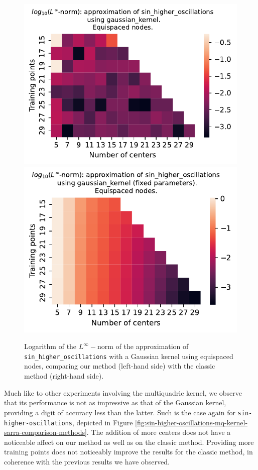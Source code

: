 \documentclass[12pt]{report} %
\begin{document}
\begin{figure}[ht]
    \centering
    \includegraphics[width=.49\textwidth]{imagenes/experiments/1d/variational/sin_higher_oscillations-Kgaussian_kernel-Equi.pdf}
    \includegraphics[width=.49\textwidth]{imagenes/experiments/1d/least_squares/opt-sin_higher_oscillations-Kgaussian_kernel-Equi.pdf}
    \caption{Logarithm of the $L^\infty-$norm of the approximation of \texttt{sin\_higher\_oscillations} with a Gaussian kernel using equispaced nodes, comparing our method (left-hand side) with the classic method (right-hand side).}
    \label{fig:sin-higher-oscillations-gaussian-kernel-comparison-methods}
\end{figure}

Much like to other experiments involving the multiquadric kernel, we observe that its performance is not as impressive as that of the Gaussian kernel, providing a digit of accuracy less than the latter. Such is the case again for \texttt{sin-higher-oscillations}, depicted in Figure \ref{fig:sin-higher-oscillations-mq-kernel-sarra-comparison-methods}. The addition of more centers does not have a noticeable affect on our method as well as on the classic method. %
Providing more training points does not noticeably improve the results for the classic method, in coherence with the previous results we have observed.
\end{document}
